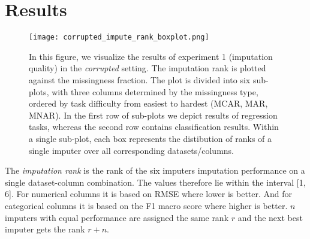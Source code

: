 \graphicspath{ {figures/} } %


\section{Results}


\begin{figure}\centering
    \texttt{[image: corrupted\_impute\_rank\_boxplot.png]}
    \caption[Corrupted imputation ranks]{In this figure, we visualize the results of experiment 1 (imputation quality) in the \textit{corrupted} setting. The imputation rank is plotted against the missingness fraction. The plot is divided into six sub-plots, with three columns determined by the missingness type, ordered by task difficulty from easiest to hardest (MCAR, MAR, MNAR). In the first row of sub-plots we depict results of regression tasks, whereas the second row contains classification results. Within a single sub-plot, each box represents the distibution of ranks of a single imputer over all corresponding datasets/columns.}\label{fig:corrupted_impute_rank_boxplot}
\end{figure}

The \textit{imputation rank} is the rank of the six imputers imputation performance on a single dataset-column combination. The values therefore lie within the interval [1, 6]. For numerical columns it is based on RMSE where lower is better. And for categorical columns it is based on the F1 macro score where higher is better. $n$ imputers with equal performance are assigned the same rank $r$ and the next best imputer gets the rank $r+n$.
